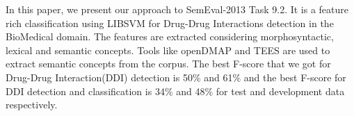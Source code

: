 In this paper, we present our approach to SemEval-2013 Task 9.2. It is a feature rich classification using LIBSVM for Drug-Drug Interactions detection
 in the BioMedical domain. The features are extracted considering
 morphosyntactic, lexical and semantic concepts. Tools like openDMAP and TEES
 are used to extract semantic concepts from the corpus. The best F-score that we
 got for Drug-Drug Interaction(DDI) detection is 50\% and 61\% and the best
 F-score for DDI detection and classification is 34\% and 48\% for test and
 development data respectively.

